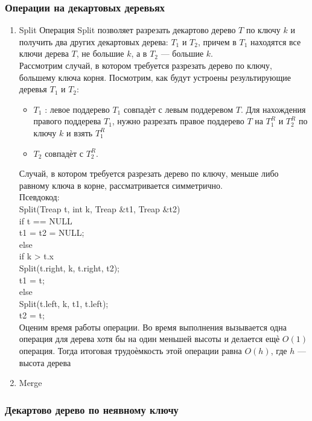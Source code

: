 \documentclass[a4paper]{article}
\begin{document}
\subsubsection{Операции на декартовых деревьях}
\begin{enumerate}
	\item Split
	Операция Split позволяет разрезать декартово дерево $T$ по ключу $k$ и получить два других декартовых дерева: $T_1$ и $T_2$, причем в $T_1$ находятся
все ключи дерева $T$, не большие $k$, а в $T_2$ — большие $k$. \\
Рассмотрим случай, в котором требуется разрезать дерево по ключу, большему ключа корня. Посмотрим, как будут устроены результирующие деревья $T_1$ и $T_2$:
\begin{itemize}
	\item $T_1$ : левое поддерево $T_1$ совпадѐт с левым поддеревом $T$. Для нахождения правого поддерева $T_1$, нужно разрезать правое поддерево $T$ на $T_1^R$ и $T_2^R$ по ключу $k$ и взять $T_1^R$
	\item $T_2$ совпадѐт с $T_2^R$.
\end{itemize}
Случай, в котором требуется разрезать дерево по ключу, меньше либо равному ключа в корне, рассматривается симметрично. \\
Псевдокод: \\
Split(Treap t, int k, Treap \&t1, Treap \&t2) \\
if t == NULL\\
	t1 = t2 = NULL;\\
else \\
     if k > t.x\\
 		Split(t.right, k, t.right, t2);\\
 		t1 = t;\\
 	 else\\
 		Split(t.left, k, t1, t.left);\\
 t2 = t;\\
Оценим время работы операции. Во время выполнения вызывается одна операция для дерева хотя бы на один меньшей высоты и делается ещѐ $O(1)$ операция. Тогда итоговая трудоѐмкость этой операции равна $O(h)$, где $h$ — высота дерева

\item Merge

\end{enumerate}
\subsubsection{Декартово дерево по неявному ключу}
\end{document}
